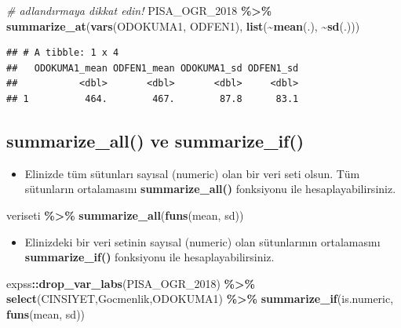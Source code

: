 \documentclass[
  oneside]{book}
\newenvironment{Shaded}{\begin{snugshade}}{\end{snugshade}}
\newcommand{\CommentTok}[1]{\textcolor[rgb]{0.56,0.35,0.01}{\textit{#1}}}
\newcommand{\FunctionTok}[1]{\textcolor[rgb]{0.13,0.29,0.53}{\textbf{#1}}}
\newcommand{\NormalTok}[1]{#1}
\newcommand{\SpecialCharTok}[1]{\textcolor[rgb]{0.81,0.36,0.00}{\textbf{#1}}}
\providecommand{\tightlist}{%
  \setlength{\itemsep}{0pt}\setlength{\parskip}{0pt}}
\begin{document}
\begin{Shaded}
\begin{Highlighting}[]
\CommentTok{\# adlandırmaya dikkat edin!}
\NormalTok{PISA\_OGR\_2018 }\SpecialCharTok{\%\textgreater{}\%}
    \FunctionTok{summarize\_at}\NormalTok{(}\FunctionTok{vars}\NormalTok{(ODOKUMA1, ODFEN1), }\FunctionTok{list}\NormalTok{(}\SpecialCharTok{\textasciitilde{}}\FunctionTok{mean}\NormalTok{(.), }\SpecialCharTok{\textasciitilde{}}\FunctionTok{sd}\NormalTok{(.)))}
\end{Highlighting}
\end{Shaded}

\begin{verbatim}
## # A tibble: 1 x 4
##   ODOKUMA1_mean ODFEN1_mean ODOKUMA1_sd ODFEN1_sd
##           <dbl>       <dbl>       <dbl>     <dbl>
## 1          464.        467.        87.8      83.1
\end{verbatim}

\hypertarget{summarize_all-ve-summarize_if}{%
\subsection{summarize\_all() ve summarize\_if()}\label{summarize_all-ve-summarize_if}}

\begin{itemize}
\tightlist
\item
  Elinizde tüm sütunları sayısal (numeric) olan bir veri seti olsun. Tüm sütunların ortalamasını \textbf{summarize\_all()} fonksiyonu ile hesaplayabilirsiniz.
\end{itemize}

\begin{Shaded}
\begin{Highlighting}[]
\NormalTok{veriseti }\SpecialCharTok{\%\textgreater{}\%} \FunctionTok{summarize\_all}\NormalTok{(}\FunctionTok{funs}\NormalTok{(mean, sd))}
\end{Highlighting}
\end{Shaded}

\begin{itemize}
\tightlist
\item
  Elinizdeki bir veri setinin sayısal (numeric) olan sütunlarının ortalamasını \textbf{summarize\_if()} fonksiyonu ile hesaplayabilirsiniz.
\end{itemize}

\begin{Shaded}
\begin{Highlighting}[]
\NormalTok{expss}\SpecialCharTok{::}\FunctionTok{drop\_var\_labs}\NormalTok{(PISA\_OGR\_2018) }\SpecialCharTok{\%\textgreater{}\%} 
    \FunctionTok{select}\NormalTok{(CINSIYET,Gocmenlik,ODOKUMA1) }\SpecialCharTok{\%\textgreater{}\%} 
    \FunctionTok{summarize\_if}\NormalTok{(is.numeric, }\FunctionTok{funs}\NormalTok{(mean, sd))}
\end{Highlighting}
\end{Shaded}
\end{document}
